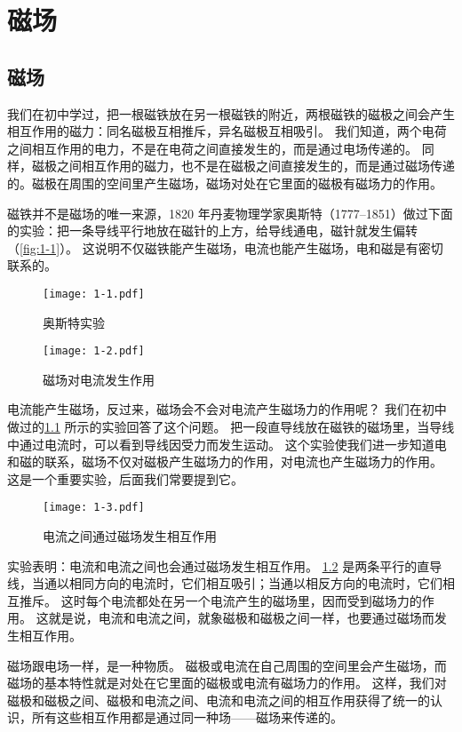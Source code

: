 \chapter{磁场}\label{chp:magnetic_field}
\section{磁场}
我们在初中学过，把一根磁铁放在另一根磁铁的附近，两根磁铁的磁极之间会产生相互作用的磁力：同名磁极互相推斥，异名磁极互相吸引。
我们知道，两个电荷之间相互作用的电力，不是在电荷之间直接发生的，而是通过电场传递的。
同样，磁极之间相互作用的磁力，也不是在磁极之间直接发生的，而是通过磁场传递的。磁极在周围的空间里产生磁场，磁场对处在它里面的磁极有磁场力的作用。

磁铁并不是磁场的唯一来源，1820 年丹麦物理学家奥斯特（1777--1851）做过下面的实验：把一条导线平行地放在磁针的上方，给导线通电，磁针就发生偏转（\cref{fig:1-1}）。
这说明不仅磁铁能产生磁场，电流也能产生磁场，电和磁是有密切联系的。
\begin{figure}
\begin{minipage}[b]{0.48\linewidth}
\centering
\texttt{[image: 1-1.pdf]}
\caption{奥斯特实验}\label{fig:1-1}
\end{minipage}
\begin{minipage}[b]{0.48\linewidth}
\centering
\texttt{[image: 1-2.pdf]}
\caption{磁场对电流发生作用}\label{fig:1-2}
\end{minipage}
\end{figure}

电流能产生磁场，反过来，磁场会不会对电流产生磁场力的作用呢？
我们在初中做过的\cref{fig:1-2} 所示的实验回答了这个问题。
把一段直导线放在磁铁的磁场里，当导线中通过电流时，可以看到导线因受力而发生运动。
这个实验使我们进一步知道电和磁的联系，磁场不仅对磁极产生磁场力的作用，对电流也产生磁场力的作用。
这是一个重要实验，后面我们常要提到它。

\begin{figure}
\texttt{[image: 1-3.pdf]}
\caption{电流之间通过磁场发生相互作用}\label{fig:1-3}
\end{figure}

实验表明：电流和电流之间也会通过磁场发生相互作用。
\cref{fig:1-3} 是两条平行的直导线，当通以相同方向的电流时，它们相互吸引；当通以相反方向的电流时，它们相互推斥。
这时每个电流都处在另一个电流产生的磁场里，因而受到磁场力的作用。
这就是说，电流和电流之间，就象磁极和磁极之间一样，也要通过磁场而发生相互作用。

磁场跟电场一样，是一种物质。
磁极或电流在自己周围的空间里会产生磁场，而磁场的基本特性就是对处在它里面的磁极或电流有磁场力的作用。
这样，我们对磁极和磁极之间、磁极和电流之间、电流和电流之间的相互作用获得了统一的认识，所有这些相互作用都是通过同一种场——磁场来传递的。

